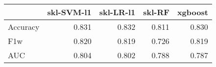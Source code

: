 \begin{tabular}{lrrrr}
\toprule
{} &  skl-SVM-l1 &  skl-LR-l1 &  skl-RF &  xgboost \\
\midrule
Accuracy &       0.831 &      0.832 &   0.811 &    0.830 \\
F1w      &       0.820 &      0.819 &   0.726 &    0.819 \\
AUC      &       0.804 &      0.802 &   0.788 &    0.787 \\
\bottomrule
\end{tabular}
